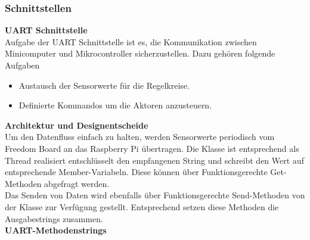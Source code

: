 \subsubsection{Schnittstellen}
\textbf{UART Schnittstelle}\\[0.2cm]
Aufgabe der UART Schnittstelle ist es, die Kommunikation zwischen Minicomputer und Mikrocontroller sicherzustellen. Dazu gehören folgende Aufgaben
\begin{itemize}
\item Austausch der Sensorwerte für die Regelkreise.
\item Definierte Kommandos um die Aktoren anzusteuern.
\end{itemize}
\textbf{Architektur und Designentscheide}\\[0.2cm]
Um den Datenfluss einfach zu halten, werden Sensorwerte periodisch vom Freedom Board an das Raspberry Pi übertragen. Die Klasse  ist entsprechend als Thread realisiert entschlüsselt den empfangenen String und schreibt den Wert auf entsprechende Member-Variabeln. Diese können über Funktionsgerechte Get-Methoden abgefragt werden.\\
Das Senden von Daten wird ebenfalls über Funktionsgerechte Send-Methoden von der Klasse  zur Verfügung gestellt. Entsprechend setzen diese Methoden die Ausgabestrings zusammen.\\[0.2cm]
\textbf{UART-Methodenstrings}
